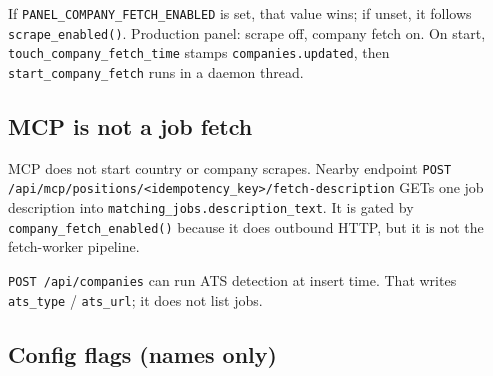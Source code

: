 \documentclass[11pt,a4paper]{article}
\begin{document}
If \texttt{PANEL\_COMPANY\_FETCH\_ENABLED} is set, that value wins; if unset,
it follows \texttt{scrape\_enabled()}. Production panel: scrape off, company
fetch on. On start, \texttt{touch\_company\_fetch\_time} stamps
\texttt{companies.updated}, then \texttt{start\_company\_fetch} runs in a
daemon thread.

\subsection{MCP is not a job fetch}

MCP does not start country or company scrapes. Nearby endpoint
\texttt{POST /api/mcp/positions/<idempotency\_key>/fetch-description} GETs one
job description into \texttt{matching\_jobs.description\_text}. It is gated by
\texttt{company\_fetch\_enabled()} because it does outbound HTTP, but it is
not the fetch-worker pipeline.

\texttt{POST /api/companies} can run ATS detection at insert time. That writes
\texttt{ats\_type} / \texttt{ats\_url}; it does not list jobs.

\subsection{Config flags (names only)}
\end{document}
